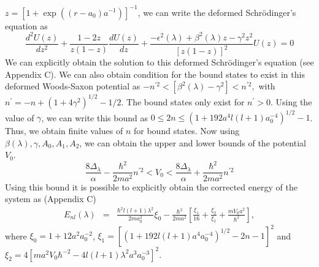 \documentclass[12pt]{article}
\begin{document}
$	z = [ 1+ \exp (({r-a_0}){a}^{-1})]^{-1}
$, we can write the deformed  Schr\"{o}dinger's equation as  
\begin{equation}\label{GUP_SE4}
	\frac{d^2 U(z)}{dz^2} + \frac{1-2z}{z(1-z)} \frac{dU(z)}{dz} + \frac{-\epsilon^2 (\lambda) + \beta^2(\lambda) z  - \gamma^2 z^2}{[z(1-z)]^2}  U(z) = 0
\end{equation}
We can explicitly obtain the solution to this deformed  Schr\"{o}dinger's equation (see Appendix C).  We can also obtain   condition for the bound states to exist in this deformed Woods-Saxon potential as 
$
-n^{'2}<[\beta^2(\lambda)-\gamma^2]<n^{'2}, 
$ with 
$n^{'}= -n + {({1+4\gamma^2})^{1/2}-1}/{2}
$. 
The bound states only exist for $n^{'} > 0$. Using the value of $\gamma $, we can 
 write this bound as $0 \le 2 n\le  (1+{192a^4l(l+1)}{a_0^{-4}})^{1/2}-1 $. 
Thus, we obtain  finite values of  $n$ for   bound states. Now using   $\beta (\lambda),\gamma,A_0,A_1,A_2 $, we can  obtain  the upper and lower bounds of the potential $ V_0$.
\begin{equation} \label{boundV0}
	\frac{8\Delta_{\lambda}}{\alpha}-\frac{\hbar^2}{2m a^2} n^{'2}<V_0<\frac{8\Delta_{\lambda}}{\alpha}+\frac{\hbar^2}{2m a^2}n^{'2} 
\end{equation}
Using this bound it is possible to explicitly obtain the corrected energy of the system as (Appendix C) 
\begin{eqnarray}
E_{nl}(\lambda)   &=&\frac{\hbar^2 l(l+1)\lambda^2}{2m a_0^2} \xi_0  -\frac{\hbar^2}{2m a^2}\left[\frac{\xi_1}{16}  +\frac{\xi_2}{\xi_1}+\frac{m V_0 a^2}{\hbar^2}\right],  
\end{eqnarray}
where  $\xi_0 = 1+12a^2 a_0^{-2}$, $\xi_1 = [(1+192l(l+1)a^4 a_0^{-4})^{1/2}-2n-1]^2$ and $\xi_2 = 4[m a^2 V_0 \hbar^{-2}-4l(l+1)\lambda^2a^3 a_0^{-3}]^2$. 
\end{document}
